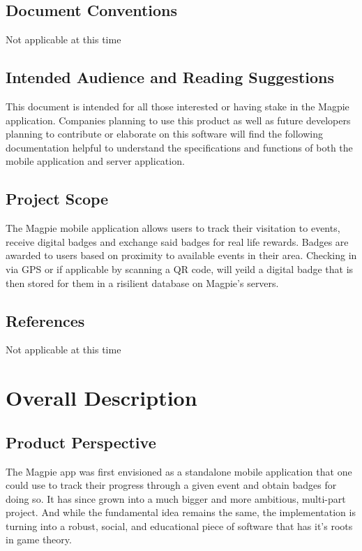\documentclass{scrreprt}
\begin{document}
\section{Document Conventions}
Not applicable at this time

\section{Intended Audience and Reading Suggestions}
This document is intended for all those interested or having stake in the Magpie
application.  Companies planning to use this product as well as future developers
planning to contribute or elaborate on this software will find the following documentation
helpful to understand the specifications and functions of both the mobile application and server application.

\section{Project Scope}
The Magpie mobile application allows users to track their visitation to events,
receive digital badges and exchange said badges for real life rewards. Badges are awarded
to users based on proximity to available events in their area.  Checking in via GPS or
if applicable by scanning a QR code, will yeild a digital badge that is then stored for them
in a risilient database on Magpie's servers.

\section{References}
Not applicable at this time

\chapter{Overall Description}

\section{Product Perspective}
The Magpie app was first envisioned as a standalone mobile application that one
could use to track their progress through a given event and obtain badges for doing so.
It has since grown into a much bigger and more ambitious, multi-part project. And while the
fundamental idea remains the same, the implementation is turning into a robust, social, and
educational piece of software that has it's roots in game theory.
\end{document}
